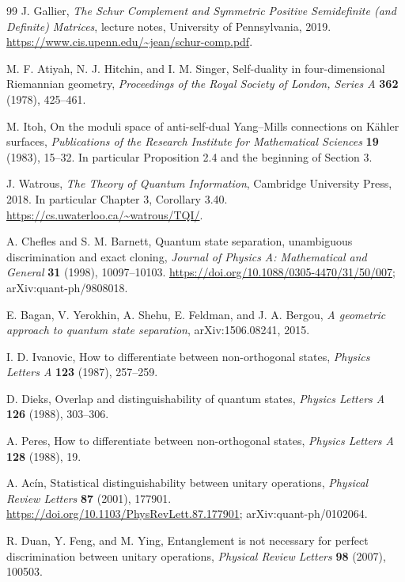 \documentclass[11pt,oneside]{article}
\numberwithin{equation}{section}
\theoremstyle{plain}
\theoremstyle{definition}
\theoremstyle{remark}
\begin{document}
\begin{thebibliography}{99}
J. Gallier, \emph{The Schur Complement and Symmetric Positive Semidefinite (and Definite) Matrices}, lecture notes, University of Pennsylvania, 2019. \url{https://www.cis.upenn.edu/~jean/schur-comp.pdf}.

M. F. Atiyah, N. J. Hitchin, and I. M. Singer, Self-duality in four-dimensional Riemannian geometry, \emph{Proceedings of the Royal Society of London, Series A} \textbf{362} (1978), 425--461.

M. Itoh, On the moduli space of anti-self-dual Yang--Mills connections on K\"ahler surfaces, \emph{Publications of the Research Institute for Mathematical Sciences} \textbf{19} (1983), 15--32. In particular Proposition 2.4 and the beginning of Section 3.

J. Watrous, \emph{The Theory of Quantum Information}, Cambridge University Press, 2018. In particular Chapter 3, Corollary 3.40. \url{https://cs.uwaterloo.ca/~watrous/TQI/}.

A. Chefles and S. M. Barnett, Quantum state separation, unambiguous discrimination and exact cloning, \emph{Journal of Physics A: Mathematical and General} \textbf{31} (1998), 10097--10103. \url{https://doi.org/10.1088/0305-4470/31/50/007}; arXiv:quant-ph/9808018.

E. Bagan, V. Yerokhin, A. Shehu, E. Feldman, and J. A. Bergou, \emph{A geometric approach to quantum state separation}, arXiv:1506.08241, 2015.

I. D. Ivanovic, How to differentiate between non-orthogonal states, \emph{Physics Letters A} \textbf{123} (1987), 257--259.

D. Dieks, Overlap and distinguishability of quantum states, \emph{Physics Letters A} \textbf{126} (1988), 303--306.

A. Peres, How to differentiate between non-orthogonal states, \emph{Physics Letters A} \textbf{128} (1988), 19.

A. Ac\'in, Statistical distinguishability between unitary operations, \emph{Physical Review Letters} \textbf{87} (2001), 177901. \url{https://doi.org/10.1103/PhysRevLett.87.177901}; arXiv:quant-ph/0102064.

R. Duan, Y. Feng, and M. Ying, Entanglement is not necessary for perfect discrimination between unitary operations, \emph{Physical Review Letters} \textbf{98} (2007), 100503.


\end{thebibliography}
\end{document}
